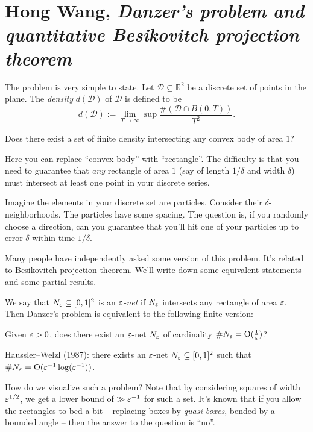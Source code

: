 \documentclass[reqno]{amsart} 
\numberwithin{theorem}{section}
\numberwithin{equation}{section}
\begin{document}
\section{Hong Wang, \emph{Danzer's problem and quantitative Besikovitch projection theorem}}

The problem is very simple to state.  Let $\mathcal{D} \subseteq \mathbb{R}^2$ be a discrete set of points in the plane.  The \emph{density} $d(\mathcal{D})$ of $\mathcal{D}$ is defined to be
\begin{equation*}
  d(\mathcal{D}) := \lim_{T \rightarrow \infty} \sup
  \frac{\# (\mathcal{D} \cap B(0, T))}{T^2}.
\end{equation*}
\begin{problem}
  Does there exist a set of finite density intersecting any convex body of area $1$?
\end{problem}
Here you can replace ``convex body'' with ``rectangle''.  The difficulty is that you need to guarantee that \emph{any} rectangle of area $1$ (say of length $1/\delta$ and width $\delta$) must intersect at least one point in your discrete series.

Imagine the elements in your discrete set are particles.  Consider their $\delta$-neighborhoods.  The particles have some spacing.  The question is, if you randomly choose a direction, can you guarantee that you'll hit one of your particles up to error $\delta$ within time $1/\delta$.

Many people have independently asked some version of this problem.  It's related to Besikovitch projection theorem.  We'll write down some equivalent statements and some partial results.

We say that $N_\varepsilon \subseteq[0, 1]^2$ is an \emph{$\varepsilon$-net} if $N_\varepsilon$ intersects any rectangle of area $\varepsilon$.  Then Danzer's problem is equivalent to the following finite version:
\begin{problem}
  Given $\varepsilon > 0$, does there exist an $\varepsilon$-net $N_\varepsilon$ of cardinality $\# N_\varepsilon = \operatorname{O}(\tfrac{1}{\varepsilon})$?
\end{problem}

Haussler--Welzl (1987): there exists an $\varepsilon$-net $N_\varepsilon \subseteq[0, 1]^2$ such that $\# N_\varepsilon = \operatorname{O}(\varepsilon^{-1} \log(\varepsilon^{-1}))$.

How do we visualize such a problem?  Note that by considering squares of width $\varepsilon^{1/2}$, we get a lower bound of $\gg \varepsilon^{-1}$ for such a set.
It's known that if you allow the rectangles to bed a bit -- replacing boxes by \emph{quasi-boxes}, bended by a bounded angle -- then the answer to the question is ``no''.
\end{document}
